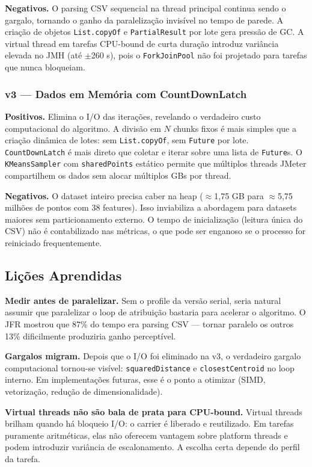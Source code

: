 \textbf{Negativos.}
O parsing CSV sequencial na thread principal continua sendo o gargalo, tornando o
ganho da paralelização invisível no tempo de parede. A criação de objetos
\texttt{List.copyOf} e \texttt{PartialResult} por lote gera pressão de GC.
A virtual thread em tarefas CPU-bound de curta duração introduz variância elevada
no JMH (até $\pm$260 s), pois o \texttt{ForkJoinPool} não foi projetado para
tarefas que nunca bloqueiam.

\subsubsection*{v3 --- Dados em Memória com CountDownLatch}

\textbf{Positivos.}
Elimina o I/O das iterações, revelando o verdadeiro custo computacional do algoritmo.
A divisão em $N$ chunks fixos é mais simples que a criação dinâmica de lotes:
sem \texttt{List.copyOf}, sem \texttt{Future} por lote. \texttt{CountDownLatch}
é mais direto que coletar e iterar sobre uma lista de \texttt{Future}s. O
\texttt{KMeansSampler} com \texttt{sharedPoints} estático permite que múltiplos
threads JMeter compartilhem os dados sem alocar múltiplos GBs por thread.

\textbf{Negativos.}
O dataset inteiro precisa caber na heap ($\approx$1{,}75 GB para $\approx$5{,}75
milhões de pontos com 38 features). Isso inviabiliza a abordagem para datasets
maiores sem particionamento externo. O tempo de inicialização (leitura única do
CSV) não é contabilizado nas métricas, o que pode ser enganoso se o processo for
reiniciado frequentemente.

\subsection{Lições Aprendidas}

\textbf{Medir antes de paralelizar.}
Sem o profile da versão serial, seria natural assumir que paralelizar o loop de
atribuição bastaria para acelerar o algoritmo. O JFR mostrou que 87\% do tempo era
parsing CSV --- tornar paralelo os outros 13\% dificilmente produziria ganho
perceptível.

\textbf{Gargalos migram.}
Depois que o I/O foi eliminado na v3, o verdadeiro gargalo computacional tornou-se
visível: \texttt{squaredDistance} e \texttt{closestCentroid} no loop interno. Em
implementações futuras, esse é o ponto a otimizar (SIMD, vetorização, redução de
dimensionalidade).

\textbf{Virtual threads não são bala de prata para CPU-bound.}
Virtual threads brilham quando há bloqueio I/O: o carrier é liberado e reutilizado.
Em tarefas puramente aritméticas, elas não oferecem vantagem sobre platform threads
e podem introduzir variância de escalonamento. A escolha certa depende do perfil
da tarefa.

